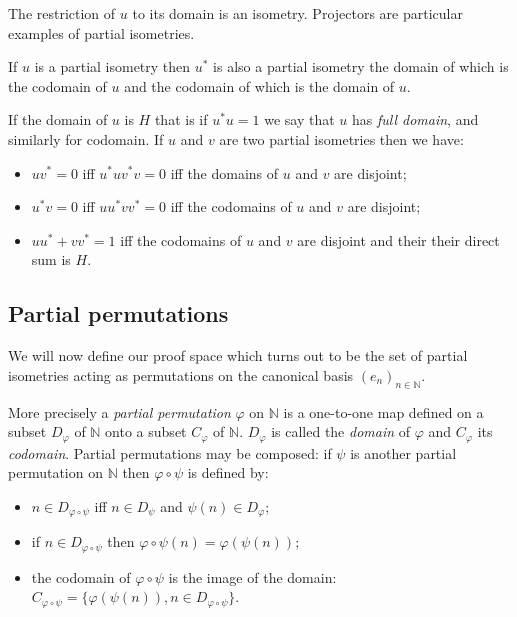 The restriction of \(u\) to its domain is an isometry. Projectors are
particular examples of partial isometries.

If \(u\) is a partial isometry then \(u^*\) is also a partial isometry
the domain of which is the codomain of \(u\) and the codomain of which
is the domain of \(u\).

If the domain of \(u\) is \(H\) that is if \(u^* u = 1\) we say that
\(u\) has \emph{full domain}, and similarly for codomain. If \(u\) and
\(v\) are two partial isometries then we have:

\begin{itemize}
\tightlist
\item
  \(uv^* = 0\) iff \(u^*uv^*v = 0\) iff the domains of \(u\) and \(v\)
  are disjoint;
\item
  \(u^*v = 0\) iff \(uu^*vv^* = 0\) iff the codomains of \(u\) and \(v\)
  are disjoint;
\item
  \(uu^* + vv^* = 1\) iff the codomains of \(u\) and \(v\) are disjoint
  and their their direct sum is \(H\).
\end{itemize}


\subsection{Partial permutations}\label{partial-permutations}

We will now define our proof space which turns out to be the set of
partial isometries acting as permutations on the canonical basis
\((e_n)_{n\in\mathbb{N}}\).

More precisely a \emph{partial permutation} \(\varphi\) on
\(\mathbb{N}\) is a one-to-one map defined on a subset \(D_\varphi\) of
\(\mathbb{N}\) onto a subset \(C_\varphi\) of \(\mathbb{N}\).
\(D_\varphi\) is called the \emph{domain} of \(\varphi\) and
\(C_\varphi\) its \emph{codomain}. Partial permutations may be composed:
if \(\psi\) is another partial permutation on \(\mathbb{N}\) then
\(\varphi\circ\psi\) is defined by:

\begin{itemize}
\tightlist
\item
  \(n\in D_{\varphi\circ\psi}\) iff \(n\in D_\psi\) and
  \(\psi(n)\in D_\varphi\);
\item
  if \(n\in D_{\varphi\circ\psi}\) then
  \(\varphi\circ\psi(n) = \varphi(\psi(n))\);
\item
  the codomain of \(\varphi\circ\psi\) is the image of the domain:
  \(C_{\varphi\circ\psi} = \{\varphi(\psi(n)), n\in D_{\varphi\circ\psi}\}\).
\end{itemize}

